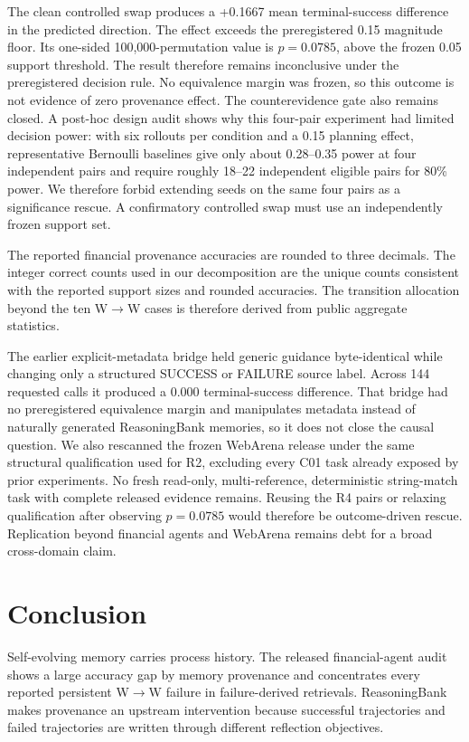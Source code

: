 The clean controlled swap produces a +0.1667 mean terminal-success difference in the predicted direction. The effect exceeds the preregistered 0.15 magnitude floor. Its one-sided 100,000-permutation value is $p=0.0785$, above the frozen 0.05 support threshold. The result therefore remains inconclusive under the preregistered decision rule. No equivalence margin was frozen, so this outcome is not evidence of zero provenance effect. The counterevidence gate also remains closed. A post-hoc design audit shows why this four-pair experiment had limited decision power: with six rollouts per condition and a 0.15 planning effect, representative Bernoulli baselines give only about 0.28--0.35 power at four independent pairs and require roughly 18--22 independent eligible pairs for 80\% power. We therefore forbid extending seeds on the same four pairs as a significance rescue. A confirmatory controlled swap must use an independently frozen support set.

The reported financial provenance accuracies are rounded to three decimals. The integer correct counts used in our decomposition are the unique counts consistent with the reported support sizes and rounded accuracies. The transition allocation beyond the ten W$\rightarrow$W cases is therefore derived from public aggregate statistics.

The earlier explicit-metadata bridge held generic guidance byte-identical while changing only a structured SUCCESS or FAILURE source label. Across 144 requested calls it produced a 0.000 terminal-success difference. That bridge had no preregistered equivalence margin and manipulates metadata instead of naturally generated ReasoningBank memories, so it does not close the causal question. We also rescanned the frozen WebArena release under the same structural qualification used for R2, excluding every C01 task already exposed by prior experiments. No fresh read-only, multi-reference, deterministic string-match task with complete released evidence remains. Reusing the R4 pairs or relaxing qualification after observing $p=0.0785$ would therefore be outcome-driven rescue. Replication beyond financial agents and WebArena remains debt for a broad cross-domain claim.

\section{Conclusion}
Self-evolving memory carries process history. The released financial-agent audit shows a large accuracy gap by memory provenance and concentrates every reported persistent W$\rightarrow$W failure in failure-derived retrievals. ReasoningBank makes provenance an upstream intervention because successful trajectories and failed trajectories are written through different reflection objectives.

